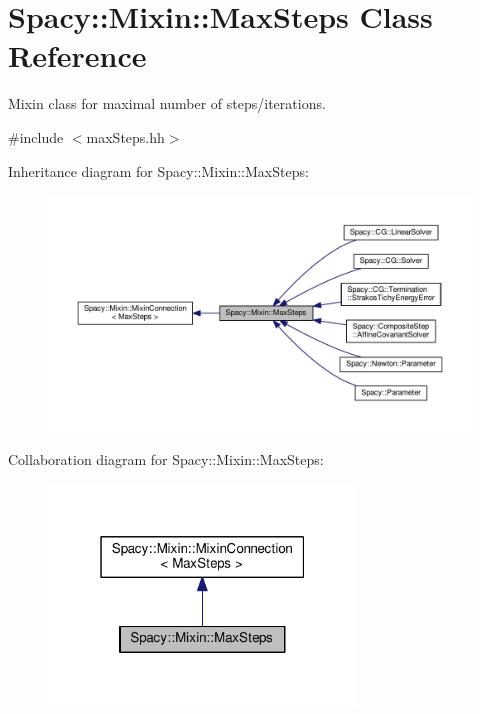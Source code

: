 \hypertarget{classSpacy_1_1Mixin_1_1MaxSteps}{}\section{Spacy\+:\+:Mixin\+:\+:Max\+Steps Class Reference}
\label{classSpacy_1_1Mixin_1_1MaxSteps}


Mixin class for maximal number of steps/iterations.  




{\ttfamily \#include $<$max\+Steps.\+hh$>$}



Inheritance diagram for Spacy\+:\+:Mixin\+:\+:Max\+Steps\+:\nopagebreak
\begin{figure}[H]
\begin{center}
\leavevmode
\includegraphics[width=350pt]{classSpacy_1_1Mixin_1_1MaxSteps__inherit__graph}
\end{center}
\end{figure}


Collaboration diagram for Spacy\+:\+:Mixin\+:\+:Max\+Steps\+:\nopagebreak
\begin{figure}[H]
\begin{center}
\leavevmode
\includegraphics[width=232pt]{classSpacy_1_1Mixin_1_1MaxSteps__coll__graph}
\end{center}
\end{figure}
